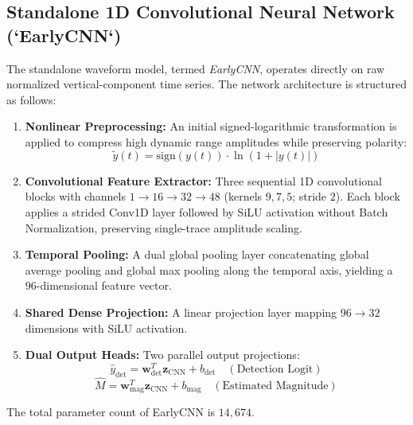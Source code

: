 \documentclass[journal]{IEEEtran}
\begin{document}
\subsection{Standalone 1D Convolutional Neural Network (`EarlyCNN`)}
The standalone waveform model, termed \textit{EarlyCNN}, operates directly on raw normalized vertical-component time series. The network architecture is structured as follows:
\begin{enumerate}
    \item \textbf{Nonlinear Preprocessing:} An initial signed-logarithmic transformation is applied to compress high dynamic range amplitudes while preserving polarity:
    \begin{equation}
    \tilde{y}(t) = \text{sign}(y(t)) \cdot \ln(1 + |y(t)|)
    \label{eq:signed_log}
    \end{equation}
    \item \textbf{Convolutional Feature Extractor:} Three sequential 1D convolutional blocks with channels $1 \to 16 \to 32 \to 48$ (kernels $9, 7, 5$; stride $2$). Each block applies a strided Conv1D layer followed by SiLU activation without Batch Normalization, preserving single-trace amplitude scaling.
    \item \textbf{Temporal Pooling:} A dual global pooling layer concatenating global average pooling and global max pooling along the temporal axis, yielding a $96$-dimensional feature vector.
    \item \textbf{Shared Dense Projection:} A linear projection layer mapping $96 \to 32$ dimensions with SiLU activation.
    \item \textbf{Dual Output Heads:} Two parallel output projections:
    \begin{equation}
    \hat{y}_{\text{det}} = \mathbf{w}_{\text{det}}^T \mathbf{z}_{\text{CNN}} + b_{\text{det}} \quad (\text{Detection Logit})
    \end{equation}
    \begin{equation}
    \hat{M} = \mathbf{w}_{\text{mag}}^T \mathbf{z}_{\text{CNN}} + b_{\text{mag}} \quad (\text{Estimated Magnitude})
    \end{equation}
\end{enumerate}
The total parameter count of EarlyCNN is $14,674$.
\end{document}
